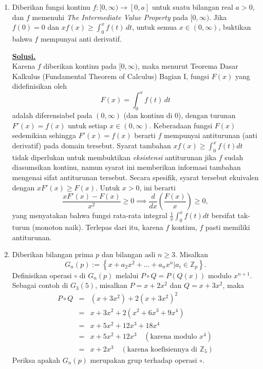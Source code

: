 \documentclass[12pt,twoside]{article}
\newenvironment{solution}
{
	\par\noindent\textbf{\underline{Solusi.}}\\
}
{
	\par
}
\begin{document}
\begin{enumerate}
  \item Diberikan fungsi kontinu $f : [0,\infty) \to [0,a]$ untuk suatu bilangan real $a>0$, dan $f$ memenuhi \textit{The Intermediate Value Property} pada $[0,\infty)$. Jika $f(0)=0$ dan $xf(x)\geq\displaystyle\int_{0}^{x}f(t)\,dt$, untuk semua $x\in (0,\infty)$, buktikan bahwa $f$ mempunyai anti derivatif.

        \begin{solution}
          Karena $f$ diberikan kontinu pada $[0, \infty)$, maka menurut Teorema Dasar Kalkulus (Fundamental Theorem of Calculus) Bagian I, fungsi $F(x)$ yang didefinisikan oleh
          \[ F(x) = \int_0^x f(t) \, dt \]
          adalah diferensiabel pada $(0, \infty)$ (dan kontinu di 0), dengan turunan $F'(x) = f(x)$ untuk setiap $x \in (0, \infty)$.
          Keberadaan fungsi $F(x)$ sedemikian sehingga $F'(x) = f(x)$ berarti $f$ mempunyai antiturunan (anti derivatif) pada domain tersebut.
          Syarat tambahan $x f(x) \ge \int_0^x f(t) dt$ tidak diperlukan untuk membuktikan \textit{eksistensi} antiturunan jika $f$ sudah diasumsikan kontinu, namun syarat ini memberikan informasi tambahan mengenai sifat antiturunan tersebut.
          Secara spesifik, syarat tersebut ekuivalen dengan $x F'(x) \ge F(x)$. Untuk $x > 0$, ini berarti
          \[ \frac{x F'(x) - F(x)}{x^2} \ge 0 \implies \frac{d}{dx} \left( \frac{F(x)}{x} \right) \ge 0, \]
          yang menyatakan bahwa fungsi rata-rata integral $\frac{1}{x} \int_0^x f(t) dt$ bersifat tak-turun (monoton naik).
          Terlepas dari itu, karena $f$ kontinu, $f$ pasti memiliki antiturunan.
        \end{solution}


  \item Diberikan bilangan prima $p$ dan bilangan asli $n \geq 3$. Misalkan
        \begin{equation*}
          G_n(p) := \left\lbrace x+a_2x^2+\dots+a_nx^n |a_i \in \mathbb{Z}_p \right\rbrace.
        \end{equation*}
        Definisikan operasi $\circ$ di $G_n(p)$ melalui $P \circ Q = P(Q(x))$ modulo $x^{n+1}$. Sebagai contoh di $G_3(5)$, misalkan $P = x+2x^2$ dan $Q = x+3x^2$, maka
        \begin{equation*}
          \begin{array}{rcl}
            P \circ Q & = & (x+3x^2)+2(x+3x^2)^2                                       \\
                      & = & x+3x^2+2(x^2+6x^3+9x^4)                                    \\
                      & = & x+5x^2+12x^3+18x^4                                         \\
                      & = & x+5x^2+12x^3 \quad (\text{karena modulo } x^4)             \\
                      & = & x+2x^3 \quad (\text{karena koefisiennya di } \mathbb{Z}_5)
          \end{array}
        \end{equation*}
        Periksa apakah $G_n(p)$ merupakan grup terhadap operasi $\circ$.


\end{enumerate}
\end{document}
